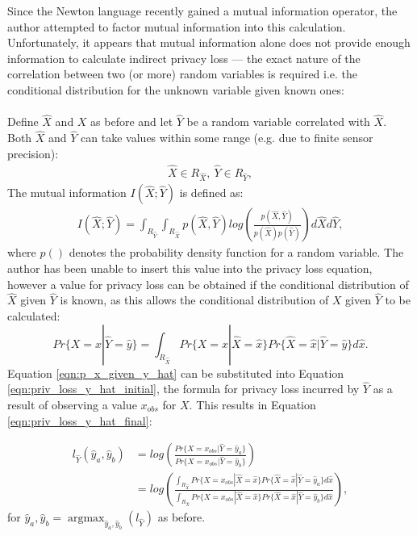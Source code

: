 \documentclass[12pt]{article}
\DeclareMathOperator*{\argmax}{argmax}
\begin{document}
\begin{appendix}
    Since the Newton language recently gained a mutual information operator, the author attempted to factor mutual information into this calculation. Unfortunately, it appears that mutual information alone does not provide enough information to calculate indirect privacy loss --- the exact nature of the correlation between two (or more) random variables is required i.e. the conditional distribution for the unknown variable given known ones:
    \\
    \\
    Define $\hat{X}$ and $X$ as before and let $\hat{Y}$ be a random variable correlated with $\hat{X}$. Both $\hat{X}$ and $\hat{Y}$ can take values within some range (e.g. due to finite sensor precision):
    \begin{align*}
      \hat{X} \in R_{\hat{X}},\ \hat{Y} \in R_{\hat{Y}},
    \end{align*}
    The mutual information $I(\hat{X};\hat{Y})$ is defined as:
    \begin{align}
      I(\hat{X};\hat{Y}) = \int_{R_{\hat{Y}}} \int_{R_{\hat{X}}} p(\hat{X}, \hat{Y}) log \left( \frac{p(\hat{X}, \hat{Y})}{p(\hat{X})p(\hat{Y})} \right) d\hat{X} d\hat{Y},
    \end{align}
    where $p()$ denotes the probability density function for a random variable. The author has been unable to insert this value into the privacy loss equation, however a value for privacy loss can be obtained if the conditional distribution of $\hat{X}$ given $\hat{Y}$ is known, as this allows the conditional distribution of $X$ given $\hat{Y}$ to be calculated:
    \begin{equation}
      Pr\{X = x | \hat{Y} = \hat{y}\} = \int_{R_{\hat{X}}}Pr\{X = x | \hat{X} = \hat{x}\} Pr\{\hat{X} = \hat{x} | \hat{Y} = \hat{y}\} d \hat{x} \label{eqn:p_x_given_y_hat}.
    \end{equation}
    Equation \ref{eqn:p_x_given_y_hat} can be substituted into Equation \ref{eqn:priv_loss_y_hat_initial}, the formula for privacy loss incurred by $\hat{Y}$ as a result of observing a value $x_{obs}$ for $X$. This results in Equation \ref{eqn:priv_loss_y_hat_final}:

    \begin{align}
      l_{\hat{Y}}(\hat{y}_a, \hat{y}_b) & = log \left( \frac{Pr\{X = x_{obs} | \hat{Y} = \hat{y}_a\}}{Pr\{X = x_{obs} | \hat{Y} = \hat{y}_b\}} \right) \label{eqn:priv_loss_y_hat_initial} \\
      & = log \left( \frac{\int_{R_{\hat{X}}} Pr\{X = x_{obs}| \hat{X} = \hat{x}\} Pr\{\hat{X}=\hat{x}|\hat{Y} = \hat{y}_a\} d\hat{x} }{\int_{R_{\hat{X}}} Pr\{X = x_{obs}| \hat{X} = \hat{x}\} Pr\{\hat{X}=\hat{x}|\hat{Y} = \hat{y}_b\} d\hat{x} }\right) \label{eqn:priv_loss_y_hat_final},
    \end{align}
    for $\hat{y}_a, \hat{y}_b = \argmax_{\hat{y}_a, \hat{y}_b}(l_{\hat{Y}})$ as before.
  \newpage

\end{appendix}
\end{document}
